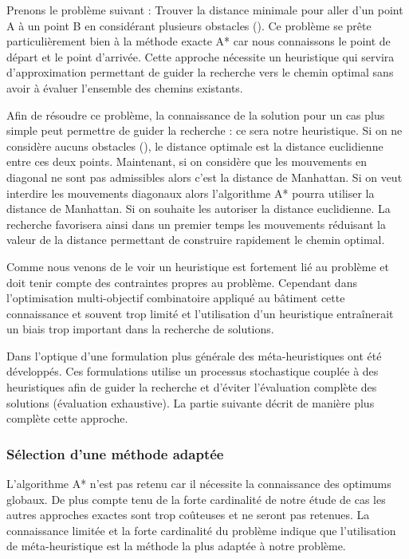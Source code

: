 Prenons le problème suivant : Trouver la distance minimale pour aller d’un point A à un point B
en considérant plusieurs obstacles ().
Ce problème se prête particulièrement bien à la méthode exacte A* car nous connaissons
le point de départ et le point d’arrivée. Cette approche nécessite un heuristique
qui servira d’approximation permettant de guider la recherche vers le chemin optimal
sans avoir à évaluer l’ensemble des chemins existants.

Afin de résoudre ce problème, la connaissance de la solution pour un cas plus simple
peut permettre de guider la recherche : ce sera notre heuristique.
Si on ne considère aucuns obstacles (), le distance optimale
est la distance euclidienne entre ces deux points. Maintenant, si on considère que
les mouvements en diagonal ne sont pas admissibles alors c’est la distance de Manhattan.
Si on veut interdire les mouvements diagonaux alors l’algorithme A* pourra utiliser
la distance de Manhattan. Si on souhaite les autoriser la distance euclidienne.
La recherche favorisera ainsi dans un premier temps les mouvements réduisant la
valeur de la distance permettant de construire rapidement le chemin optimal.


Comme nous venons de le voir un heuristique est fortement lié au problème et doit tenir
compte des contraintes propres au problème. Cependant dans l’optimisation multi-objectif combinatoire
appliqué au bâtiment cette connaissance et souvent trop limité et l’utilisation
d’un heuristique entraînerait un biais trop important dans la recherche de solutions.

Dans l’optique d’une formulation plus générale des méta-heuristiques ont été développés.
Ces formulations utilise un processus stochastique couplée à des heuristiques afin de guider
la recherche et d’éviter l’évaluation complète des solutions (évaluation exhaustive). La partie
suivante décrit de manière plus complète cette approche.

\subsubsection{Sélection d’une méthode adaptée} %
\label{ssub:selection_d_une_methode_adaptee}
L’algorithme A* n’est pas retenu car il nécessite la connaissance des optimums globaux.
De plus compte tenu de la forte cardinalité de notre étude de cas les autres approches exactes
sont trop coûteuses et ne seront pas retenues.
La connaissance limitée et la forte cardinalité du problème indique que l’utilisation
de méta-heuristique est la méthode la plus adaptée à notre problème.

